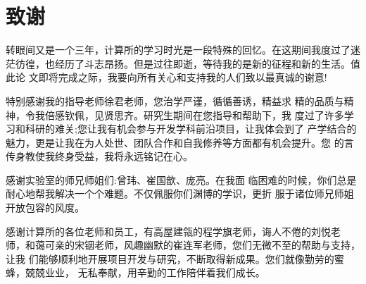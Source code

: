 


\chapter[致谢]{致\quad 谢}%
\thispagestyle{noheaderstyle}%

转眼间又是一个三年，计算所的学习时光是一段特殊的回忆。在这期间我度过了迷 茫彷徨，也经历了斗志昂扬。但是过往即逝，等待我的是新的征程和新的生活。值此论 文即将完成之际，我要向所有关心和支持我的人们致以最真诚的谢意!

特别感谢我的指导老师徐君老师，您治学严谨，循循善诱，精益求 精的品质与精神，令我倍感钦佩，见贤思齐。研究生期间在您指导和帮助下，我 度过了许多学习和科研的难关;您让我有机会参与开发学科前沿项目，让我体会到了 产学结合的魅力，更是让我在为人处世、团队合作和自我修养等方面都有机会提升。您 的言传身教使我终身受益，我将永远铭记在心。

感谢实验室的师兄师姐们:曾玮、崔国歆、庞亮。在我面 临困难的时候，你们总是耐心地帮我解决一个个难题。不仅佩服你们渊博的学识，更折 服于诸位师兄师姐开放包容的风度。

感谢计算所的各位老师和员工，有高屋建瓴的程学旗老师，诲人不倦的刘悦老 师，和蔼可亲的宋铟老师，风趣幽默的崔连军老师，您们无微不至的帮助与支持，让我 们能够顺利地开展项目开发与研究，不断取得新成果。您们就像勤劳的蜜蜂，兢兢业业， 无私奉献，用辛勤的工作陪伴着我们成长。

